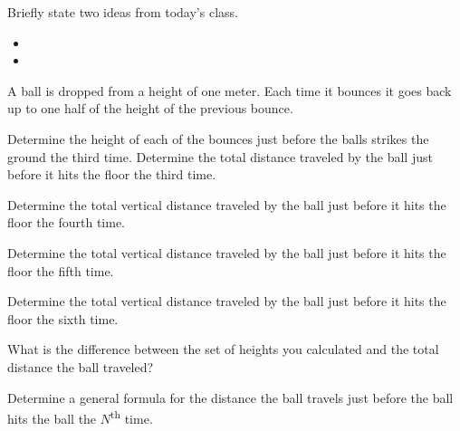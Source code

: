 \begin{problem}
\item Briefly state two ideas from today's class.
  \begin{itemize}
  \item
  \item
  \end{itemize}
  \item A ball is dropped from a height of one meter. Each time it bounces it goes
    back up to one half of the height of the previous bounce.
    \begin{subproblem}
    \item Determine the height of each of the bounces just before the balls strikes
          the ground the third time. Determine the total distance traveled by the ball
          just before it hits the floor the third time.
      \vfill
    \item Determine the total vertical distance traveled by the ball
      just before it hits the floor the fourth time.
      \vfill
    \item Determine the total vertical distance traveled by the ball
      just before it hits the floor the fifth time.
      \vfill
    \item Determine the total vertical distance traveled by the ball
      just before it hits the floor the sixth time.
      \vfill
    \end{subproblem}

    \clearpage

    \item What is the difference between the set of heights you calculated and the
      total distance the ball traveled?

      \vfill

    \item Determine a general formula for the distance the ball travels just before
      the ball hits the ball the $N$\textsuperscript{th} time.
      \vfill

\end{problem}


